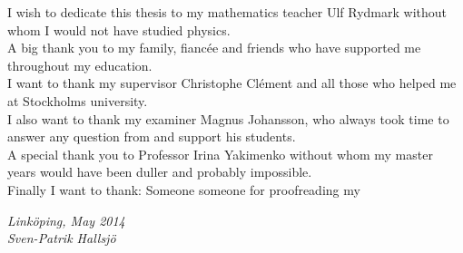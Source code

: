 \begin{acknowledgments}
I wish to dedicate this thesis to my mathematics teacher Ulf Rydmark without whom I would not have studied physics.\\
A big thank you to my family, fiancée and friends who have supported me throughout my education.\\
I want to thank my supervisor Christophe Clément and all those who helped me at Stockholms university. \\
I also want to thank my examiner Magnus Johansson, who always took time to answer any question from and support his students. \\ 
A special thank you to Professor Irina Yakimenko without whom my master years would have been duller and probably impossible.\\
Finally I want to thank: Someone someone for proofreading my

  \addvspace{1em}
  \begin{flushright}
    \textit{%
      Linköping, May 2014\\
      Sven-Patrik Hallsjö%
    }
  \end{flushright}
\end{acknowledgments}
